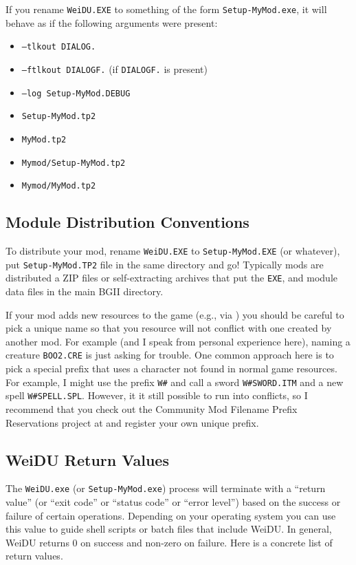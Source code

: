 \documentclass{article}
\def\ttref#1{\ahrefloc{#1}{\tt #1}}
\def\t#1{{\tt #1}}
\begin{document}
If you rename \t{WeiDU.EXE} to something of the form \t{Setup-MyMod.exe},
it will behave as if the following arguments were present:
\begin{itemize}
\item \t{--tlkout \t{DIALOG.}\ttref{TLK}}
\item \t{--ftlkout \t{DIALOGF.}\ttref{TLK}} (if \t{\t{DIALOGF.}\ttref{TLK}} is present)
\item \t{--log Setup-MyMod.DEBUG}
\item \t{Setup-MyMod.tp2}
\item \t{MyMod.tp2}
\item \t{Mymod/Setup-MyMod.tp2}
\item \t{Mymod/MyMod.tp2}
\end{itemize}

\subsection{Module Distribution Conventions}

To distribute your mod, rename \t{WeiDU.EXE} to \t{Setup-MyMod.EXE} (or
whatever), put \t{Setup-MyMod.TP2} file in the same directory and go!
Typically mods are distributed a ZIP files or self-extracting archives that
put the \t{EXE}, \ttref{TP2} and module data files in the main BGII
directory.

If your mod adds new resources to the game (e.g., via \ttref{COPY}) you
should be careful to pick a unique name so that you resource will not
conflict with one created by another mod. For example (and I speak from
personal experience here), naming a creature \t{BOO2.CRE} is just asking
for trouble. One common approach here is to pick a special prefix that uses
a character not found in normal game resources. For example, I might use
the prefix \t{W\#} and call a sword \t{W\#SWORD.ITM}
and a new spell \t{W\#SPELL.SPL}. However, it it still possible to run into
conflicts, so I recommend that you check out the
Community Mod Filename Prefix Reservations project at
 and
register your own unique prefix.

\subsection{WeiDU Return Values}

The \t{WeiDU.exe} (or \t{Setup-MyMod.exe}) process will terminate with
a ``return value'' (or ``exit code'' or ``status code'' or ``error level'')
based on the success or failure of certain operations. Depending on your
operating system you can use this value to guide shell scripts or batch
files that include WeiDU. In general, WeiDU returns 0 on success and
non-zero on failure. Here is a concrete list of return values.
\end{document}
